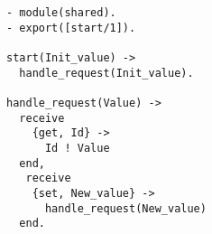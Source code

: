 \begin{figure}[h!]
\begin{lstlisting}[style=erlangcode, caption=The Erlang module \code{shared}, label=fig:shared]
- module(shared).
- export([start/1]).

start(Init_value) -> 
  handle_request(Init_value).

handle_request(Value) -> 
  receive 
    {get, Id} -> 
      Id ! Value
  end,
   receive 
    {set, New_value} -> 
      handle_request(New_value)
  end.
\end{lstlisting}
\end{figure}
